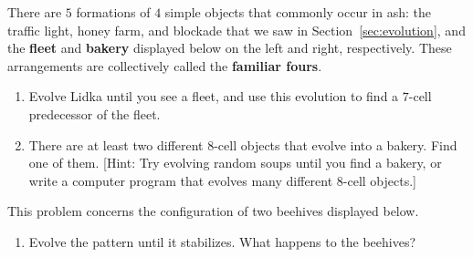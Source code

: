 \begin{multicols}{2}
	
	\mfilbreak
	
	
	\begin{problemstar}\label{exer:familiar_fours} 
		There are $5$ formations of $4$ simple objects that commonly occur in ash: the traffic light, honey farm, and blockade that we saw in Section~\ref{sec:evolution}, and the \textbf{fleet} and \textbf{bakery} displayed below on the left and right, respectively. These arrangements are collectively called the \textbf{familiar fours}.
		
		\begin{center}\captionsetup[subfigure]{labelformat=empty}
			\begin{minipage}{.4\linewidth}
				\centering {}
			\end{minipage} \quad %
			\begin{minipage}{.4\linewidth}
				\centering {}
			\end{minipage}
		\end{center}
		
		\begin{enumerate}[label=\bf\color{ocre}(\alph*)]
			\item Evolve Lidka until you see a fleet, and use this evolution to find a $7$-cell predecessor of the fleet.
			
			\item There are at least two different $8$-cell objects that evolve into a bakery. Find one of them. [Hint: Try evolving random soups until you find a bakery, or write a computer program that evolves many different $8$-cell objects.]
		\end{enumerate}
	\end{problemstar}
	
	
	\mfilbreak
	
	
	\begin{problemstar}\label{exer:beehive_pair} 
		This problem concerns the configuration of two beehives displayed below.
		
		\begin{center}
		\end{center}
		
		\begin{enumerate}[label=\bf\color{ocre}(\alph*)]\vspace*{-0.25cm}
			\item Evolve the pattern until it stabilizes. What happens to the beehives?
			

\end{enumerate}
\end{problemstar}
\end{multicols}
